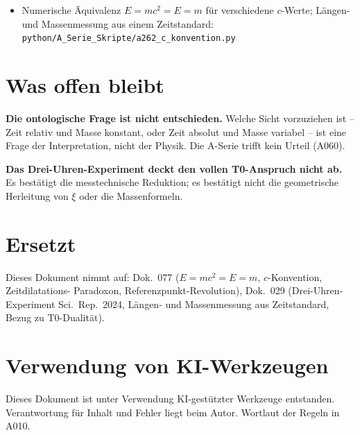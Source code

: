 \begin{itemize}[leftmargin=2em,itemsep=2pt,topsep=2pt]
  \item Numerische Äquivalenz $E=mc^2=E=m$ für verschiedene $c$-Werte; Längen-
    und Massenmessung aus einem Zeitstandard:
    \texttt{python/A\_Serie\_Skripte/a262\_c\_konvention.py}
\end{itemize}

\section{Was offen bleibt}

\textbf{Die ontologische Frage ist nicht entschieden.} Welche Sicht vorzuziehen ist
-- Zeit relativ und Masse konstant, oder Zeit absolut und Masse variabel -- ist eine
Frage der Interpretation, nicht der Physik. Die A-Serie trifft kein Urteil (A060).

\textbf{Das Drei-Uhren-Experiment deckt den vollen T0-Anspruch nicht ab.} Es
bestätigt die messtechnische Reduktion; es bestätigt nicht die geometrische Herleitung
von $\xi$ oder die Massenformeln.

\section{Ersetzt}

Dieses Dokument nimmt auf: Dok.~077 ($E=mc^2=E=m$, $c$-Konvention, Zeitdilatations-
Paradoxon, Referenzpunkt-Revolution), Dok.~029 (Drei-Uhren-Experiment Sci.\ Rep.\ 2024,
Längen- und Massenmessung aus Zeitstandard, Bezug zu T0-Dualität).

\section{Verwendung von KI-Werkzeugen}

Dieses Dokument ist unter Verwendung KI-gestützter Werkzeuge entstanden. Verantwortung
für Inhalt und Fehler liegt beim Autor. Wortlaut der Regeln in A010.
